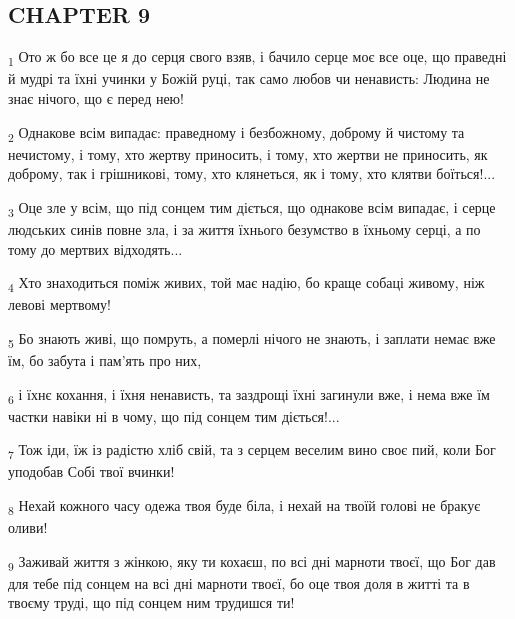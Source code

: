 \subsection{CHAPTER 9}
\begin{tcolorbox}
\textsubscript{1} Ото ж бо все це я до серця свого взяв, і бачило серце моє все оце, що праведні й мудрі та їхні учинки у Божій руці, так само любов чи ненависть: Людина не знає нічого, що є перед нею!
\end{tcolorbox}
\begin{tcolorbox}
\textsubscript{2} Однакове всім випадає: праведному і безбожному, доброму й чистому та нечистому, і тому, хто жертву приносить, і тому, хто жертви не приносить, як доброму, так і грішникові, тому, хто клянеться, як і тому, хто клятви боїться!...
\end{tcolorbox}
\begin{tcolorbox}
\textsubscript{3} Оце зле у всім, що під сонцем тим діється, що однакове всім випадає, і серце людських синів повне зла, і за життя їхнього безумство в їхньому серці, а по тому до мертвих відходять...
\end{tcolorbox}
\begin{tcolorbox}
\textsubscript{4} Хто знаходиться поміж живих, той має надію, бо краще собаці живому, ніж левові мертвому!
\end{tcolorbox}
\begin{tcolorbox}
\textsubscript{5} Бо знають живі, що помруть, а померлі нічого не знають, і заплати немає вже їм, бо забута і пам'ять про них,
\end{tcolorbox}
\begin{tcolorbox}
\textsubscript{6} і їхнє кохання, і їхня ненависть, та заздрощі їхні загинули вже, і нема вже їм частки навіки ні в чому, що під сонцем тим діється!...
\end{tcolorbox}
\begin{tcolorbox}
\textsubscript{7} Тож іди, їж із радістю хліб свій, та з серцем веселим вино своє пий, коли Бог уподобав Собі твої вчинки!
\end{tcolorbox}
\begin{tcolorbox}
\textsubscript{8} Нехай кожного часу одежа твоя буде біла, і нехай на твоїй голові не бракує оливи!
\end{tcolorbox}
\begin{tcolorbox}
\textsubscript{9} Заживай життя з жінкою, яку ти кохаєш, по всі дні марноти твоєї, що Бог дав для тебе під сонцем на всі дні марноти твоєї, бо оце твоя доля в житті та в твоєму труді, що під сонцем ним трудишся ти!
\end{tcolorbox}
